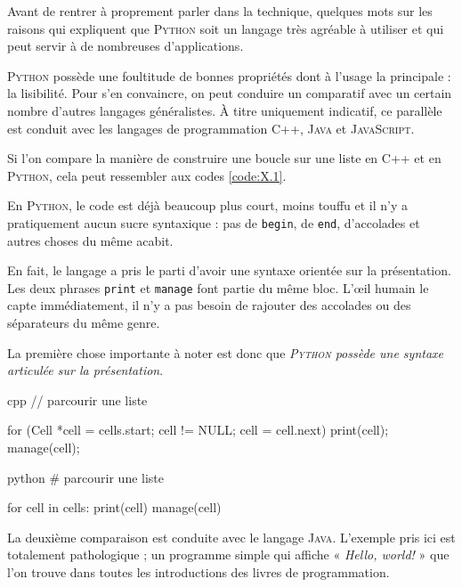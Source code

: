 Avant de rentrer à proprement parler dans la technique, quelques mots sur les raisons qui expliquent que \textsc{Python} soit un langage très agréable à utiliser et qui peut servir à de nombreuses d'applications. 

\textsc{Python} possède une foultitude de bonnes propriétés dont à l'usage la principale : la lisibilité. Pour s'en convaincre, on peut conduire un comparatif avec un certain nombre d'autres langages généralistes. À titre uniquement indicatif, ce parallèle est conduit avec les langages de programmation \textsc{C++}, \textsc{Java} et \textsc{JavaScript}.



Si l'on compare la manière de construire une boucle sur une liste en \textsc{C++} et en \textsc{Python}, cela peut ressembler aux codes \ref{code:X.1}. 

En \textsc{Python}, le code est déjà beaucoup plus court, moins touffu et il n'y a pratiquement aucun sucre syntaxique : pas de \texttt{begin}, de \texttt{end}, d'accolades et autres choses du même acabit.

En fait, le langage a pris le parti d'avoir une syntaxe orientée sur la présentation. Les deux phrases \texttt{print} et \texttt{manage} font partie du même bloc. L'œil humain le capte immédiatement, il n'y a pas besoin de rajouter des accolades ou des séparateurs du même genre.

La première chose importante à noter est donc que \textit{\textsc{Python} possède une syntaxe articulée sur la présentation}.

\begin{jazzcode*}
\caption{\label{code:X.1}Comparaison d'une boucle réalisée en \textsc{C++} et en \textsc{Python}.}
\begin{codebox}[width=0.665\linewidth, nobeforeafter]{cpp}
// parcourir une liste

for (Cell *cell = cells.start; cell != NULL; cell = cell.next) {
	print(cell);
	manage(cell);
}
\end{codebox}
\qquad\quad %
\begin{codebox}[width=0.265\linewidth, nobeforeafter]{python}
# parcourir une liste

for cell in cells:
	print(cell)
	manage(cell)
\end{codebox}
\end{jazzcode*}

La deuxième comparaison est conduite avec le langage \textsc{Java}. L'exem\-ple pris ici est totalement pathologique ; un programme simple qui affiche « \textit{Hello, world!} » que l'on trouve dans toutes les introductions des livres de programmation.


